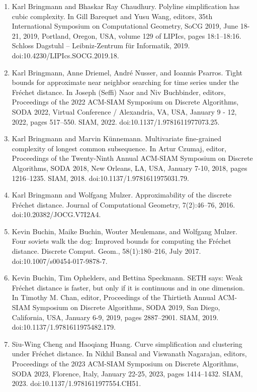\documentclass[10pt,a4paper]{article}
\begin{document}
\begin{enumerate}
\item[]  [7]  Karl Bringmann and Bhaskar Ray Chaudhury.  Polyline simplification has cubic complexity.  In Gill Barequet and Yusu Wang, editors, 35th International Symposium on Computational Geometry, SoCG 2019, June 18-21, 2019, Portland, Oregon, USA, volume 129 of LIPIcs, pages 18:1–18:16. Schloss Dagstuhl – Leibniz-Zentrum für Informatik, 2019.  doi:10.4230/LIPIcs.SOCG.2019.18.  
\item[]  [8]  Karl Bringmann, Anne Driemel, André Nusser, and Ioannis Psarros.  Tight bounds for approximate near neighbor searching for time series under the Fréchet distance.  In Joseph (Seffi) Naor and Niv Buchbinder, editors, Proceedings of the 2022 ACM-SIAM Symposium on Discrete Algorithms, SODA 2022, Virtual Conference / Alexandria, VA, USA, January 9 - 12, 2022, pages 517–550. SIAM, 2022.  doi:10.1137/1.9781611977073.25.  
\item[]  [9]  Karl Bringmann and Marvin Künnemann.  Multivariate fine-grained complexity of longest common subsequence.  In Artur Czumaj, editor, Proceedings of the Twenty-Ninth Annual ACM-SIAM Symposium on Discrete Algorithms, SODA 2018, New Orleans, LA, USA, January 7-10, 2018, pages 1216–1235. SIAM, 2018.  doi:10.1137/1.9781611975031.79.  
\item[]  [10]  Karl Bringmann and Wolfgang Mulzer.  Approximability of the discrete Fréchet distance.  Journal of Computational Geometry, 7(2):46–76, 2016.  doi:10.20382/JOCG.V7I2A4.  
\item[]  [11]  Kevin Buchin, Maike Buchin, Wouter Meulemans, and Wolfgang Mulzer.  Four soviets walk the dog: Improved bounds for computing the Fréchet distance.  Discrete Comput. Geom., 58(1):180–216, July 2017.  doi:10.1007/s00454-017-9878-7.  
\item[]  [12]  Kevin Buchin, Tim Ophelders, and Bettina Speckmann.  SETH says: Weak Fréchet distance is faster, but only if it is continuous and in one dimension.  In Timothy M. Chan, editor, Proceedings of the Thirtieth Annual ACM-SIAM Symposium on Discrete Algorithms, SODA 2019, San Diego, California, USA, January 6-9, 2019, pages 2887–2901. SIAM, 2019.  doi:10.1137/1.9781611975482.179.  
\item[]  [13]  Siu-Wing Cheng and Haoqiang Huang.  Curve simplification and clustering under Fréchet distance.  In Nikhil Bansal and Viswanath Nagarajan, editors, Proceedings of the 2023 ACM-SIAM Symposium on Discrete Algorithms, SODA 2023, Florence, Italy, January 22-25, 2023, pages 1414–1432. SIAM, 2023.  doi:10.1137/1.9781611977554.CH51.  

\end{enumerate}
\end{document}
